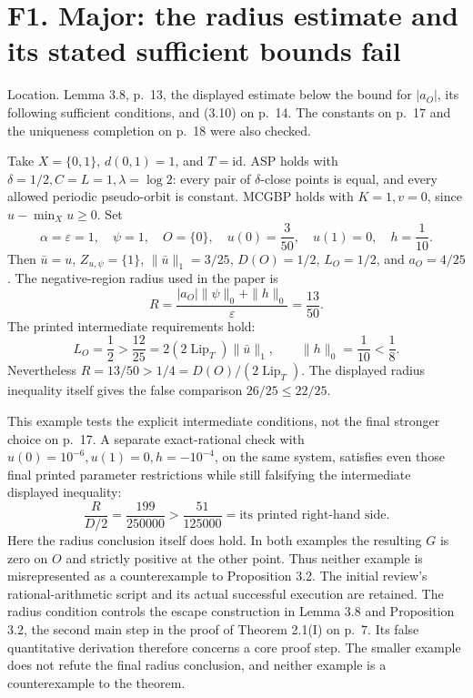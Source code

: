 \documentclass[10pt]{article}
\begin{document}
\section*{F1. Major: the radius estimate and its stated sufficient bounds fail}
Location. Lemma 3.8, p. 13, the displayed estimate below the bound for \(|a_O|\), its following sufficient conditions, and (3.10) on p. 14. The constants on p. 17 and the uniqueness completion on p. 18 were also checked.\par
Take \(X=\{0,1\}\), \(d(0,1)=1\), and \(T=\mathrm{id}\). ASP holds with \(\delta=1/2,C=L=1,\lambda=\log2\): every pair of \(\delta\)-close points is equal, and every allowed periodic pseudo-orbit is constant. MCGBP holds with \(K=1,v=0\), since \(u-\min_Xu\ge0\). Set \[\alpha=\varepsilon=1,\quad \psi=1,\quad O=\{0\},\quad
 u(0)=\frac3{50},\quad u(1)=0,\quad h=\frac1{10}.\] Then \(\bar u=u\), \(Z_{u,\psi}=\{1\}\), \(\|\bar u\|_1=3/25\), \(D(O)=1/2\), \(L_O=1/2\), and \(a_O=4/25\). The negative-region radius used in the paper is \[R=\frac{|a_O|\|\psi\|_0+\|h\|_0}{\varepsilon}=\frac{13}{50}.\] The printed intermediate requirements hold: \[L_O=\frac12>\frac{12}{25}
 =2(2\operatorname{Lip}_T)\|\bar u\|_1,\qquad
 \|h\|_0=\frac1{10}<\frac18.\] Nevertheless \(R=13/50>1/4=D(O)/(2\operatorname{Lip}_T)\). The displayed radius inequality itself gives the false comparison \(26/25\le22/25\).\par
This example tests the explicit intermediate conditions, not the final stronger choice on p. 17. A separate exact-rational check with \(u(0)=10^{-6},u(1)=0,h=-10^{-4}\), on the same system, satisfies even those final printed parameter restrictions while still falsifying the intermediate displayed inequality: \[\frac{R}{D/2}=\frac{199}{250000}>
 \frac{51}{125000}=\text{its printed right-hand side}.\] Here the radius conclusion itself does hold. In both examples the resulting \(G\) is zero on \(O\) and strictly positive at the other point. Thus neither example is misrepresented as a counterexample to Proposition 3.2. The initial review’s rational-arithmetic script and its actual successful execution are retained. The radius condition controls the escape construction in Lemma 3.8 and Proposition 3.2, the second main step in the proof of Theorem 2.1(I) on p. 7. Its false quantitative derivation therefore concerns a core proof step. The smaller example does not refute the final radius conclusion, and neither example is a counterexample to the theorem.\par
\end{document}
